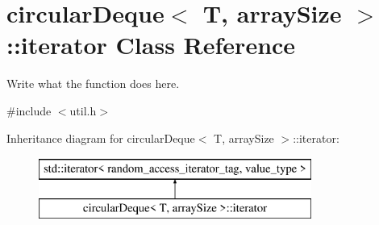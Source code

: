 \hypertarget{classcircularDeque_1_1iterator}{\section{circular\+Deque$<$ T, array\+Size $>$\+:\+:iterator Class Reference}
\label{classcircularDeque_1_1iterator}
}


Write what the function does here.  




{\ttfamily \#include $<$util.\+h$>$}

Inheritance diagram for circular\+Deque$<$ T, array\+Size $>$\+:\+:iterator\+:\begin{figure}[H]
\begin{center}
\leavevmode
\includegraphics[height=2.000000cm]{classcircularDeque_1_1iterator}
\end{center}
\end{figure}
